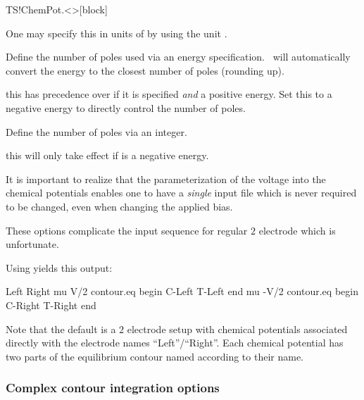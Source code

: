 \begin{fdfentry}{TS!ChemPot.<>}[block]
\begin{fdfoptions}
    One may specify this in units of  by
    using the unit .


    Define the number of poles used via an energy
    specification. \tsiesta\ will automatically convert the energy to
    the closest number of poles (rounding up).
    
    \note this has precedence over
     if it is specified
    \emph{and} a positive energy. Set this to a negative energy to
    directly control the number of poles.


    Define the number of poles via an integer.
    
    \note this will only take effect if
     is a negative energy. 

  \end{fdfoptions}

  It is important to realize that the parameterization of the voltage
  into the chemical potentials enables one to have a \emph{single}
  input file which is never required to be changed, even when changing
  the applied bias.

\end{fdfentry}

These options complicate the input sequence for regular $2$ electrode
which is unfortunate. 

Using  yields this output:
\begin{fdfexample}
    Left
    Right
    mu V/2
    contour.eq
      begin
        C-Left
        T-Left
      end
    mu -V/2
    contour.eq
      begin
        C-Right
        T-Right
      end
\end{fdfexample}

Note that the default is a $2$ electrode setup with chemical
potentials associated directly with the electrode names
``Left''/``Right''. Each chemical potential has two parts of the
equilibrium contour named according to their name.



\subsubsection{Complex contour integration options}


